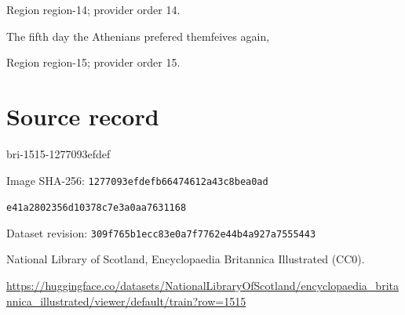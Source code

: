 \documentclass[11pt]{article}
\begin{document}
{\scriptsize\color{gray} Region region-14; provider order 14.\par}
\medskip

The fifth day the Athenians prefered themfeives again,
\par

{\scriptsize\color{gray} Region region-15; provider order 15.\par}
\medskip
\newpage\section*{Source record}
bri-1515-1277093efdef\par
Image SHA-256: \texttt{1277093efdefb66474612a43c8bea0ad}\par\texttt{e41a2802356d10378c7e3a0aa7631168}\par
Dataset revision: \texttt{309f765b1ecc83e0a7f7}\texttt{762e44b4a927a7555443}\par
National Library of Scotland, Encyclopaedia Britannica Illustrated (CC0).\par
\url{https://huggingface.co/datasets/NationalLibraryOfScotland/encyclopaedia_britannica_illustrated/viewer/default/train?row=1515}
\end{document}
